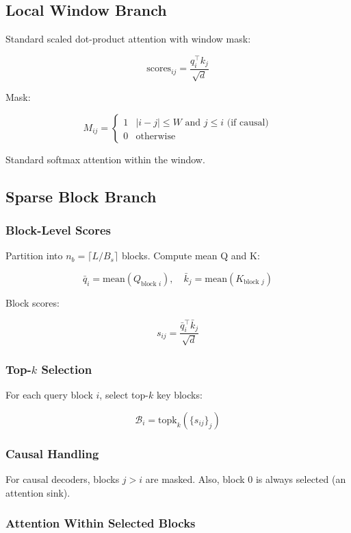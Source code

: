 \subsection{Local Window Branch}

Standard scaled dot-product attention with window mask:

\[
\text{scores}_{ij} = \frac{q_i^\top k_j}{\sqrt{d}}
\tag{4.1}
\]

Mask:

\[
M_{ij} = \begin{cases} 1 & |i - j| \leq W \text{ and } j \leq i \text{ (if causal)} \\ 0 & \text{otherwise} \end{cases}
\tag{4.2}
\]

Standard softmax attention within the window.

\subsection{Sparse Block Branch}

\subsubsection{Block-Level Scores}

Partition into $n_b = \lceil L / B_s \rceil$ blocks. Compute mean Q and K:

\[
\bar{q}_i = \text{mean}(Q_{\text{block } i}), \quad
\bar{k}_j = \text{mean}(K_{\text{block } j})
\tag{4.3}
\]

Block scores:

\[
s_{ij} = \frac{\bar{q}_i^\top \bar{k}_j}{\sqrt{d}}
\tag{4.4}
\]

\subsubsection{Top-$k$ Selection}

For each query block $i$, select top-$k$ key blocks:

\[
\mathcal{B}_i = \text{topk}_{k}(\{s_{ij}\}_j)
\tag{4.5}
\]

\subsubsection{Causal Handling}

For causal decoders, blocks $j > i$ are masked. Also, block 0 is always 
selected (an attention sink).

\subsubsection{Attention Within Selected Blocks}

